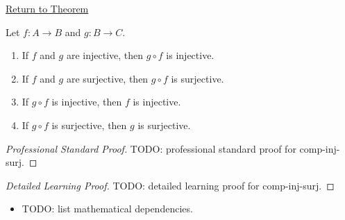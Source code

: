\newpage
{}
\label{prf:comp-inj-surj}

\begin{remark*}[Return]
\hyperref[thm:comp-inj-surj]{Return to Theorem}
\end{remark*}

\begin{theorem*}
Let $f : A \to B$ and $g : B \to C$.
\begin{enumerate}[label=(\roman*)]
\item If $f$ and $g$ are injective, then $g \circ f$ is injective.
\item If $f$ and $g$ are surjective, then $g \circ f$ is surjective.
\item If $g \circ f$ is injective, then $f$ is injective.
\item If $g \circ f$ is surjective, then $g$ is surjective.
\end{enumerate}
\end{theorem*}

\begin{proof}[Professional Standard Proof]
\LRAProofBodyStart
TODO: professional standard proof for comp-inj-surj.
\end{proof}

\begin{proof}[Detailed Learning Proof]
\LRAProofBodyStart
TODO: detailed learning proof for comp-inj-surj.
\end{proof}

\begin{remark*}
\end{remark*}

\begin{dependencies}
\begin{itemize}
  \item TODO: list mathematical dependencies.
\end{itemize}
\end{dependencies}

\clearpage

